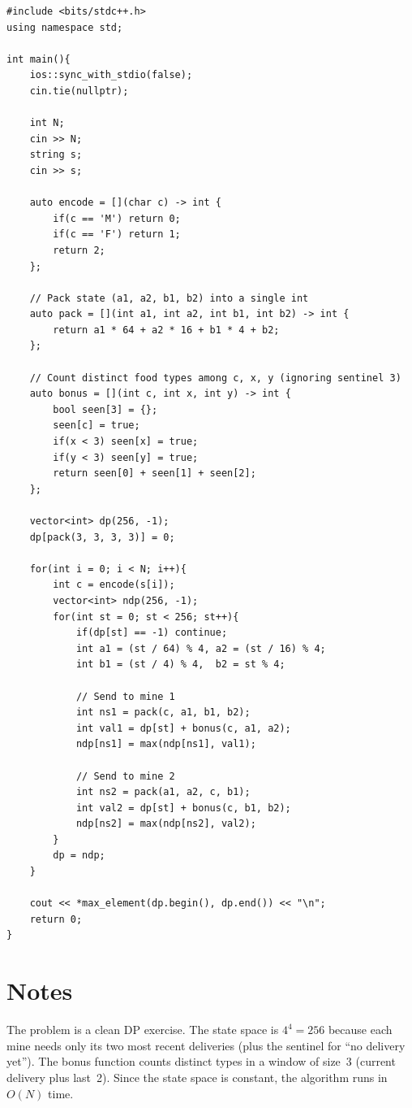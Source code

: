\documentclass[11pt,a4paper]{article}
\begin{document}
\begin{lstlisting}
#include <bits/stdc++.h>
using namespace std;

int main(){
    ios::sync_with_stdio(false);
    cin.tie(nullptr);

    int N;
    cin >> N;
    string s;
    cin >> s;

    auto encode = [](char c) -> int {
        if(c == 'M') return 0;
        if(c == 'F') return 1;
        return 2;
    };

    // Pack state (a1, a2, b1, b2) into a single int
    auto pack = [](int a1, int a2, int b1, int b2) -> int {
        return a1 * 64 + a2 * 16 + b1 * 4 + b2;
    };

    // Count distinct food types among c, x, y (ignoring sentinel 3)
    auto bonus = [](int c, int x, int y) -> int {
        bool seen[3] = {};
        seen[c] = true;
        if(x < 3) seen[x] = true;
        if(y < 3) seen[y] = true;
        return seen[0] + seen[1] + seen[2];
    };

    vector<int> dp(256, -1);
    dp[pack(3, 3, 3, 3)] = 0;

    for(int i = 0; i < N; i++){
        int c = encode(s[i]);
        vector<int> ndp(256, -1);
        for(int st = 0; st < 256; st++){
            if(dp[st] == -1) continue;
            int a1 = (st / 64) % 4, a2 = (st / 16) % 4;
            int b1 = (st / 4) % 4,  b2 = st % 4;

            // Send to mine 1
            int ns1 = pack(c, a1, b1, b2);
            int val1 = dp[st] + bonus(c, a1, a2);
            ndp[ns1] = max(ndp[ns1], val1);

            // Send to mine 2
            int ns2 = pack(a1, a2, c, b1);
            int val2 = dp[st] + bonus(c, b1, b2);
            ndp[ns2] = max(ndp[ns2], val2);
        }
        dp = ndp;
    }

    cout << *max_element(dp.begin(), dp.end()) << "\n";
    return 0;
}
\end{lstlisting}

\section{Notes}
The problem is a clean DP exercise. The state space is $4^4=256$ because each mine needs only its two most recent deliveries (plus the sentinel for ``no delivery yet''). The bonus function counts distinct types in a window of size~3 (current delivery plus last~2). Since the state space is constant, the algorithm runs in $O(N)$ time.
\end{document}
